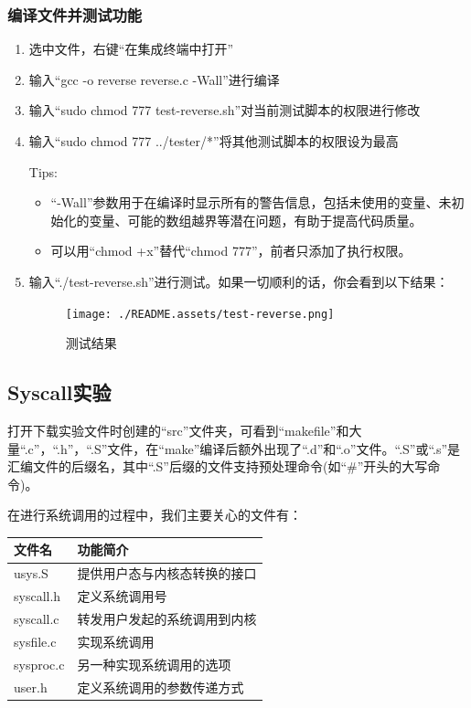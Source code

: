 \documentclass[fontset=ubuntu]{ctexart}
\begin{document}
\subsubsection{编译文件并测试功能}

\begin{enumerate}
    \item 选中文件，右键“在集成终端中打开”
    \item 输入“gcc -o reverse reverse.c -Wall”进行编译
    \item 输入“sudo chmod 777 test-reverse.sh”对当前测试脚本的权限进行修改
    \item 输入“sudo chmod 777 ../tester/*”将其他测试脚本的权限设为最高 %

          \noindent Tips:
          \vspace{-0.3cm}
          \begin{itemize}
              \item “-Wall”参数用于在编译时显示所有的警告信息，包括未使用的变量、未初始化的变量、可能的数组越界等潜在问题，有助于提高代码质量。
              \item 可以用“chmod +x”替代“chmod 777”，前者只添加了执行权限。
          \end{itemize}
    \item 输入“./test-reverse.sh”进行测试。如果一切顺利的话，你会看到以下结果：
          \begin{figure}[htbp]
              \centering
              \texttt{[image: ./README.assets/test-reverse.png]}
              \caption{测试结果}
          \end{figure}
\end{enumerate}

\subsection{Syscall实验}

打开下载实验文件时创建的“src”文件夹，可看到“makefile”和大量“.c”，“.h”，“.S”文件，在“make”编译后额外出现了“.d”和“.o”文件。“.S”或“.s”是汇编文件的后缀名，其中“.S”后缀的文件支持预处理命令(如“\#”开头的大写命令)。%

在进行系统调用的过程中，我们主要关心的文件有\cite{xv6official}：

\begin{center}
    \begin{tabularx}{0.8\textwidth}{>{\centering\arraybackslash}X >{\centering\arraybackslash}X}
        \toprule
        文件名    & 功能简介                     \\
        \midrule
        usys.S    & 提供用户态与内核态转换的接口 \\
        syscall.h & 定义系统调用号               \\
        syscall.c & 转发用户发起的系统调用到内核 \\
        sysfile.c & 实现系统调用                 \\
        sysproc.c & 另一种实现系统调用的选项     \\
        user.h    & 定义系统调用的参数传递方式   \\
        \bottomrule
    \end{tabularx}
\end{center}
\end{document}
